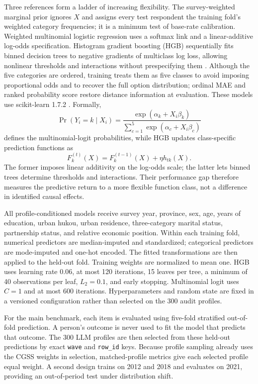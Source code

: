 \documentclass[11pt]{article}
\begin{document}
Three references form a ladder of increasing flexibility. The survey-weighted marginal prior ignores $X$ and assigns every test respondent the training fold's weighted category frequencies; it is a minimum test of base-rate calibration. Weighted multinomial logistic regression uses a softmax link and a linear-additive log-odds specification. Histogram gradient boosting (HGB) sequentially fits binned decision trees to negative gradients of multiclass log loss, allowing nonlinear thresholds and interactions without prespecifying them \citep{friedman2001gradient}. Although the five categories are ordered, training treats them as five classes to avoid imposing proportional odds and to recover the full option distribution; ordinal MAE and ranked probability score restore distance information at evaluation. These models use scikit-learn 1.7.2 \citep{pedregosa2011scikit}. Formally,
\begin{equation}
\Pr(Y_i=k\mid X_i)=
\frac{\exp(\alpha_k+X_i\beta_k)}
{\sum_{c=1}^{5}\exp(\alpha_c+X_i\beta_c)}
\end{equation}
defines the multinomial-logit probabilities, while HGB updates class-specific prediction functions as
\begin{equation}
F_k^{(t)}(X)=F_k^{(t-1)}(X)+\eta h_{tk}(X).
\end{equation}
The former imposes linear additivity on the log-odds scale; the latter lets binned trees determine thresholds and interactions. Their performance gap therefore measures the predictive return to a more flexible function class, not a difference in identified causal effects.

All profile-conditioned models receive survey year, province, sex, age, years of education, urban hukou, urban residence, three-category marital status, partnership status, and relative economic position. Within each training fold, numerical predictors are median-imputed and standardized; categorical predictors are mode-imputed and one-hot encoded. The fitted transformations are then applied to the held-out fold. Training weights are normalized to mean one. HGB uses learning rate $0.06$, at most 120 iterations, 15 leaves per tree, a minimum of 40 observations per leaf, $L_2=0.1$, and early stopping. Multinomial logit uses $C=1$ and at most 600 iterations. Hyperparameters and random state are fixed in a versioned configuration rather than selected on the 300 audit profiles.

For the main benchmark, each item is evaluated using five-fold stratified out-of-fold prediction. A person's outcome is never used to fit the model that predicts that outcome. The 300 LLM profiles are then selected from these held-out predictions by exact \texttt{wave} and \texttt{row\_id} keys. Because profile sampling already uses the CGSS weights in selection, matched-profile metrics give each selected profile equal weight. A second design trains on 2012 and 2018 and evaluates on 2021, providing an out-of-period test under distribution shift.
\end{document}
